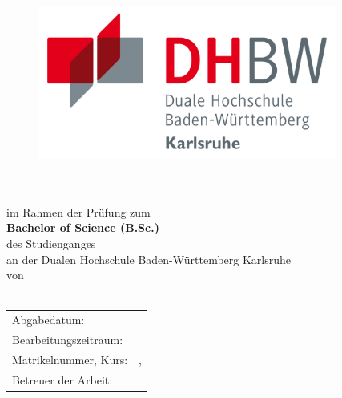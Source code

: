 \thispagestyle{empty}
\begin{titlepage}
\enlargethispage{4cm}

\begin{figure}
	\centering
	\includegraphics[height=5cm]{Bilder/Logos/Logo_DHBW.pdf} 
\end{figure}
		
\vspace*{0.1cm}

\begin{center}
	\huge{\textbf{\titel}}\\[1.5cm]
	\Large{\textbf{\arbeit}}\\[0.5cm]
	\normalsize{im Rahmen der Prüfung zum\\[1ex] \textbf{Bachelor of Science (B.Sc.)}}\\[0.5cm]
	\Large{des Studienganges \studiengang}\\[1ex]
	\normalsize{an der Dualen Hochschule Baden-Württemberg Karlsruhe}\\[1cm]
	\normalsize{von}\\[1ex] \Large{\textbf{\autor}} \\[1cm]
\end{center}

\vspace*{0.4cm}

\begin{center}
	\begin{tabular}{ll}
		Abgabedatum:                     & \abgabe \\[0.2cm]
		Bearbeitungszeitraum:            & \bearbeitungszeitraum \\[0.2cm]
		Matrikelnummer, Kurs:            & \matrikelnr , \kurs \\[0.2cm]

		Betreuer der Arbeit:   & \betreuerDhbw \\[0.2cm]
	\end{tabular} 
\end{center}
\end{titlepage}
